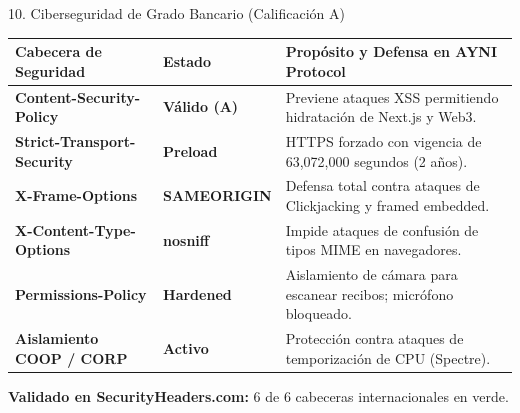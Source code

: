 \documentclass[10pt,aspectratio=169]{beamer}
\begin{document}
\begin{frame}{10. Ciberseguridad de Grado Bancario (Calificación A)}
  \begin{center}
    \small
    \begin{tabular}{llp{7.8cm}}
      \toprule
      \textbf{Cabecera de Seguridad} & \textbf{Estado} & \textbf{Propósito y Defensa en AYNI Protocol} \\
      \midrule
      \textbf{Content-Security-Policy} & \textcolor{AyniGreen}{\textbf{Válido (A)}} & Previene ataques XSS permitiendo hidratación de Next.js y Web3. \\
      \textbf{Strict-Transport-Security} & \textcolor{AyniGreen}{\textbf{Preload}} & HTTPS forzado con vigencia de 63,072,000 segundos (2 años). \\
      \textbf{X-Frame-Options} & \textcolor{AyniGreen}{\textbf{SAMEORIGIN}} & Defensa total contra ataques de Clickjacking y framed embedded. \\
      \textbf{X-Content-Type-Options} & \textcolor{AyniGreen}{\textbf{nosniff}} & Impide ataques de confusión de tipos MIME en navegadores. \\
      \textbf{Permissions-Policy} & \textcolor{AyniGreen}{\textbf{Hardened}} & Aislamiento de cámara para escanear recibos; micrófono bloqueado. \\
      \textbf{Aislamiento COOP / CORP} & \textcolor{AyniGreen}{\textbf{Activo}} & Protección contra ataques de temporización de CPU (Spectre). \\
      \bottomrule
    \end{tabular}
  \end{center}
  \vspace{0.2cm}
  \centering
  \scriptsize \textbf{Validado en SecurityHeaders.com:} 6 de 6 cabeceras internacionales en verde.
\end{frame}
\end{document}
